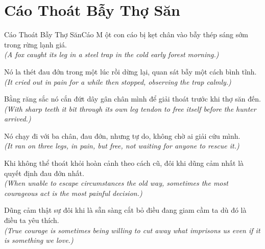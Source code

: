 \section{Cáo Thoát Bẫy Thợ Săn}
\begin{truyen}{Cáo Thoát Bẫy Thợ Săn}{Cáo}
M ột con cáo bị kẹt chân vào bẫy thép sáng sớm trong rừng lạnh giá.\\
\textit{(A fox caught its leg in a steel trap in the cold early forest morning.)}

Nó la thét đau đớn trong một lúc rồi dừng lại, quan sát bẫy một cách bình tĩnh.\\
\textit{(It cried out in pain for a while then stopped, observing the trap calmly.)}

Bằng răng sắc nó cắn đứt dây gân chân mình để giải thoát trước khi thợ săn đến.\\
\textit{(With sharp teeth it bit through its own leg tendon to free itself before the hunter arrived.)}

Nó chạy đi với ba chân, đau đớn, nhưng tự do, không chờ ai giải cứu mình.\\
\textit{(It ran on three legs, in pain, but free, not waiting for anyone to rescue it.)}

Khi không thể thoát khỏi hoàn cảnh theo cách cũ, đôi khi dũng cảm nhất là quyết định đau đớn nhất.\\
\textit{(When unable to escape circumstances the old way, sometimes the most courageous act is the most painful decision.)}

\end{truyen}
\begin{baihoc}
  Dũng cảm thật sự đôi khi là sẵn sàng cắt bỏ điều đang giam cầm ta dù đó là điều ta yêu thích.\\
  \textit{(True courage is sometimes being willing to cut away what imprisons us even if it is something we love.)}
\end{baihoc}
